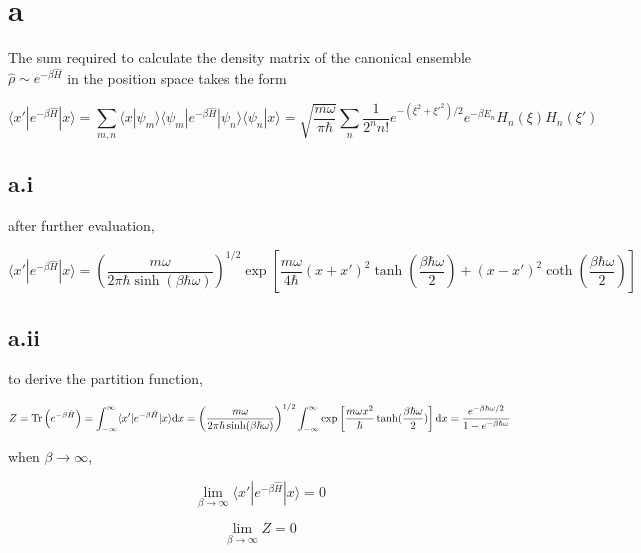 \section*{a}
\label{sec:a}

The sum required to calculate the density matrix of the canonical ensemble $\hat{\rho}\sim e^{-\beta\hat{H}}$ in the position space takes the form

\begin{equation}
    \langle x'|e^{-\beta\hat{H}}|x\rangle = \sum_{m,n}\langle x|\psi_m\rangle\langle\psi_m|e^{-\beta\hat{H}}|\psi_n\rangle\langle\psi_n|x\rangle=\sqrt{\frac{m\omega}{\pi\hbar}}\sum_n\frac{1}{2^nn!}e^{-(\xi^2+\xi'^2)/2}e^{-\beta E_n}H_n(\xi)H_n(\xi')
\end{equation}

\subsection*{a.i}

after further evaluation,

\begin{equation}
    \langle x'|e^{-\beta\hat{H}}|x\rangle = \left(\frac{m\omega}{2\pi\hbar\sinh(\beta\hbar\omega)}\right)^{1/2} \exp\left[\frac{m\omega}{4\hbar}(x+x')^2\tanh(\frac{\beta\hbar\omega}{2})+(x-x')^2\coth(\frac{\beta\hbar\omega}{2})\right]
\end{equation}

\subsection*{a.ii}

to derive the partition function, 

\begin{equation}
    Z = \operatorname{Tr}\left(e^{-\beta\hat{H}}\right) = \int_{-\infty}^{\infty}\langle x'|e^{-\beta\hat{H}}|x\rangle\mathrm{d}x = \left(\frac{m\omega}{2\pi\hbar\sinh(\beta\hbar\omega)}\right)^{1/2} \int_{-\infty}^{\infty} \exp\left[\frac{m\omega x^2}{\hbar}\tanh(\frac{\beta\hbar\omega}{2})\right]\mathrm{d}x = \frac{e^{-\beta\hbar\omega/2}}{1-e^{-\beta\hbar\omega}}
\end{equation}

when $\beta\rightarrow\infty$,

\begin{equation}
    \lim_{\beta\rightarrow\infty}\langle x'|e^{-\beta\hat{H}}|x\rangle = 0
\end{equation}

\begin{equation}
    \lim_{\beta\rightarrow\infty}Z = 0
\end{equation}

